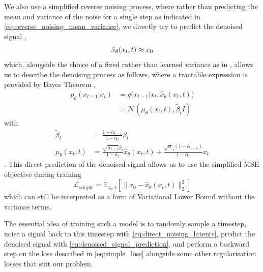 We also use a simplified reverse noising process, where rather than predicting the mean and variance of the noise for a single step as indicated in \eqref{eq:reverse_noising_mean_variance}, we directly try to predict the denoised signal \cite{ramesh2022hierarchical},
\begin{equation}
    \label{eq:denoised_signal_prediction}
    \hat{x}_{\theta}(x_t, t) \approx x_0 \\
\end{equation}
which, alongside the choice of a fixed rather than learned variance as in \cite{ddpm}, allows us to describe the denoising process as follows, where a tractable expression is provided by Bayes Theorem \cite{improved_diffusion},
\begin{equation}
    \label{eq:direct_prediction_denoising}
    \begin{aligned}
    p_{\theta}(x_{t-1} | x_t) &= q\big(x_{t-1} | x_t, \hat{x}_{\theta}(x_t, t)\big)  \\
    &= \mathcal{N}(\mu_{\theta}(x_t, t), \tilde{\beta}_t I)
    \end{aligned}
\end{equation}
with 
\begin{equation}
    \label{eq:direct_prediction_denoising_details}
    \begin{aligned}
    \tilde{\beta}_t &= \frac{1 - \bar{\alpha}_{t-1}}{1 - \bar{\alpha}_t} \beta_t \\
    \mu_{\theta}(x_t, t) &= \frac{\sqrt{\bar{\alpha}_{t-1}}\beta_t}{1-\bar{\alpha}_t}\hat{x}_{\theta}(x_t, t) + \frac{\sqrt{\alpha}_t(1-\bar{\alpha}_{t-1})}{1-\bar{\alpha}_t}x_t
    \end{aligned}
\end{equation}
.
This direct prediction of the denoised signal allows us to use the simplified MSE objective \cite{ddpm,ramesh2022hierarchical} during training
\begin{equation}
    \label{eq:simple_loss}
    \mathcal{L}_{simple} = \mathbb{E}_{x_0,t}\left[ \| x_0 - \hat{x}_{\theta}(x_t, t) \|_2^2 \right]
\end{equation}
which can still be interpreted as a form of Variational Lower Bound without the variance terms.

The essential idea of training such a model is to randomly sample a timestep, noise a signal back to this timestep with \eqref{eq:direct_noising_latents}, predict the denoised signal with \eqref{eq:denoised_signal_prediction}, and perform a backward step on the loss described in \eqref{eq:simple_loss} alongside some other regularisation losses that suit our problem.

